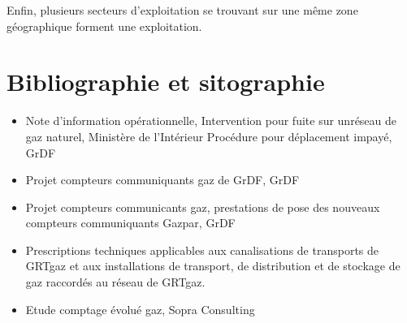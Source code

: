 \documentclass[
12pt,
french,                           %
a4paper,
]{article}
\begin{document}
Enfin, plusieurs secteurs d'exploitation se trouvant sur une même zone
géographique forment une exploitation.

\section{Bibliographie et sitographie}

\begin{itemize}
\item
  Note d'information opérationnelle, Intervention pour fuite sur
  unréseau de gaz naturel, Ministère de l'Intérieur Procédure pour
  déplacement impayé, GrDF
\item
  Projet compteurs communiquants gaz de GrDF, GrDF
\item
  Projet compteurs communicants gaz, prestations de pose des nouveaux
  compteurs communiquants Gazpar, GrDF
\item
  Prescriptions techniques applicables aux canalisations de transports
  de GRTgaz et aux installations de transport, de distribution et de
  stockage de gaz raccordés au réseau de GRTgaz.
\item
  Etude comptage évolué gaz, Sopra Consulting
\end{itemize}

\end{document}
